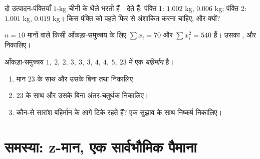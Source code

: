 \begin{exercise}[$\star\star$]\label{exo:g11:stat:8}
दो उत्पादन-पंक्तियाँ $1$-kg चीनी के थैले भरती हैं।  देते हैं:
पंक्ति 1:  $1.002$ kg,  $0.006$ kg; पंक्ति 2:  $1.001$ kg,
 $0.019$ kg। किस पंक्ति को पहले फिर से अंशांकित करना चाहिए, और
क्यों?
\end{exercise}

\begin{exercise}[$\star\star$]\label{exo:g11:stat:9}
$n = 10$ मानों वाले किसी आँकड़ा-समुच्चय के लिए $\sum x_i = 70$ और $\sum x_i^2 = 540$ हैं। उसका ,
 और  निकालिए।
\end{exercise}

\begin{exercise}[$\star\star\star$]\label{exo:g11:stat:10}
आँकड़ा-समुच्चय $1,\ 2,\ 2,\ 3,\ 3,\ 3,\ 4,\ 4,\ 5,\ 23$ में एक \emph{बहिर्मान} है।
\begin{enumerate}
  \item मान $23$ के साथ और उसके बिना  तथा  निकालिए।
  \item $23$ के साथ और उसके बिना अंतर-चतुर्थक  निकालिए।
  \item कौन-से सारांश बहिर्मान के आगे टिके रहते हैं? एक सुझाव के साथ
        निष्कर्ष निकालिए।
\end{enumerate}
\end{exercise}

\section{समस्या: z-मान, एक सार्वभौमिक पैमाना}

